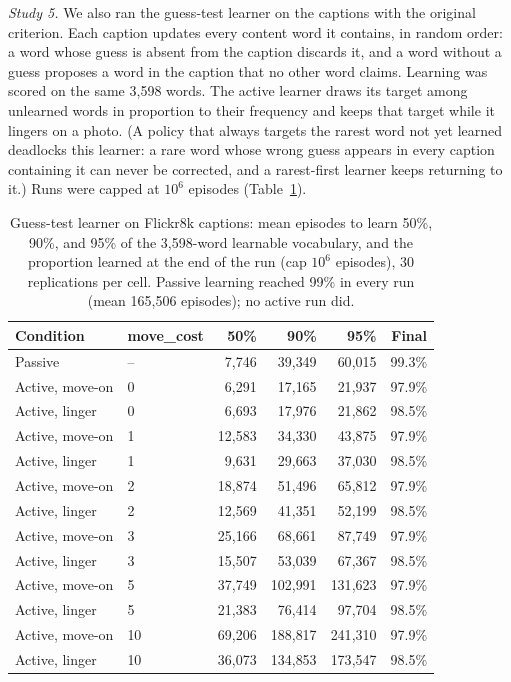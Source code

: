 \documentclass[11pt]{article}
\begin{document}
\textit{Study 5.} We also ran the guess-test learner on the captions with the original criterion. Each caption updates every content word it contains, in random order: a word whose guess is absent from the caption discards it, and a word without a guess proposes a word in the caption that no other word claims. Learning was scored on the same 3,598 words. The active learner draws its target among unlearned words in proportion to their frequency and keeps that target while it lingers on a photo. (A policy that always targets the rarest word not yet learned deadlocks this learner: a rare word whose wrong guess appears in every caption containing it can never be corrected, and a rarest-first learner keeps returning to it.) Runs were capped at $10^6$ episodes (Table~\ref{tab-flickr-oracle}).

\begin{table}[h]
\centering
\caption{\label{tab-flickr-oracle} Guess-test learner on Flickr8k captions: mean episodes to learn 50\%, 90\%, and 95\% of the 3,598-word learnable vocabulary, and the proportion learned at the end of the run (cap $10^6$ episodes), 30 replications per cell. Passive learning reached 99\% in every run (mean 165,506 episodes); no active run did.}
\small
\begin{tabular}{llrrrr}
\hline
Condition & move\_cost & 50\% & 90\% & 95\% & Final \\
\hline
Passive        & --  &  7{,}746 & 39{,}349 &  60{,}015 & 99.3\% \\
Active, move-on & 0  &  6{,}291 & 17{,}165 &  21{,}937 & 97.9\% \\
Active, linger  & 0  &  6{,}693 & 17{,}976 &  21{,}862 & 98.5\% \\
Active, move-on & 1  & 12{,}583 & 34{,}330 &  43{,}875 & 97.9\% \\
Active, linger  & 1  &  9{,}631 & 29{,}663 &  37{,}030 & 98.5\% \\
Active, move-on & 2  & 18{,}874 & 51{,}496 &  65{,}812 & 97.9\% \\
Active, linger  & 2  & 12{,}569 & 41{,}351 &  52{,}199 & 98.5\% \\
Active, move-on & 3  & 25{,}166 & 68{,}661 &  87{,}749 & 97.9\% \\
Active, linger  & 3  & 15{,}507 & 53{,}039 &  67{,}367 & 98.5\% \\
Active, move-on & 5  & 37{,}749 & 102{,}991 & 131{,}623 & 97.9\% \\
Active, linger  & 5  & 21{,}383 & 76{,}414 &  97{,}704 & 98.5\% \\
Active, move-on & 10 & 69{,}206 & 188{,}817 & 241{,}310 & 97.9\% \\
Active, linger  & 10 & 36{,}073 & 134{,}853 & 173{,}547 & 98.5\% \\
\hline
\end{tabular}
\end{table}
\end{document}
